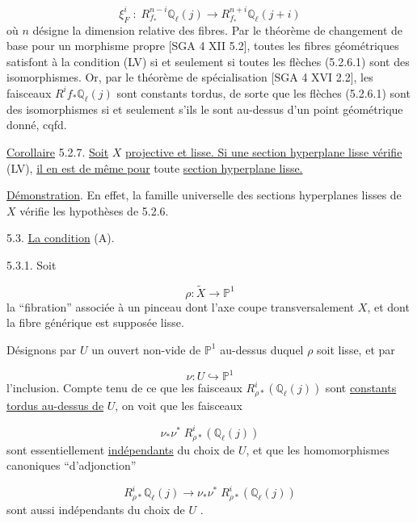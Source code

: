 \begin{equation}\tag{5.2.6.1}
\xi_F^i \; : \; R^{n-i}_{f_*}\mathbb{Q}_\ell(j) \longrightarrow R^{n+i}_{f_*}\mathbb{Q}_\ell(j+i)
\end{equation}
où $n$ désigne la dimension relative des fibres. Par le théorème de changement de base pour un morphisme propre [SGA 4 XII 5.2], toutes les fibres géométriques satisfont à la condition (LV) si et seulement si toutes les flèches (5.2.6.1) sont des isomorphismes. Or, par le théorème de spécialisation [SGA 4 XVI 2.2], les faisceaux $R^i f_*\mathbb{Q}_\ell(j)$ sont constants tordus, de sorte que les flèches (5.2.6.1) sont des isomorphismes si et seulement s'ils le sont au-dessus d'un point géométrique donné, cqfd.

\underline{Corollaire} 5.2.7. \underline{Soit} $X$ \underline{projective et lisse. Si une section hyperplane lisse vérifie} (LV), \underline{il en est de même pour} toute \underline{section hyperplane lisse.}

\underline{Démonstration}. En effet, la famille universelle des sections hyperplanes lisses de $X$ vérifie les hypothèses de 5.2.6.



5.3. \underline{La condition} (A).

5.3.1. Soit

\begin{equation*}
\rho : \widetilde{X} \longrightarrow \mathbb{P}^1
\end{equation*}
la ``fibration'' associée à un pinceau dont l'axe coupe transversalement $X$, et dont la fibre générique est supposée lisse.

Désignons par $U$ un ouvert non-vide de $\mathbb{P}^1$ au-dessus duquel $\rho$ soit lisse, et par

\begin{equation}\tag{5.3.1.1}
\nu : U \hookrightarrow \mathbb{P}^1
\end{equation}
l'inclusion. Compte tenu de ce que les faisceaux $R^i_{\rho*}(\mathbb{Q}_\ell(j))$ sont \underline{constants tordus au-dessus de} $U$, on voit que les faisceaux

\begin{equation*}
\nu_*\nu^* \; R^i_{\rho*}(\mathbb{Q}_\ell(j))
\end{equation*}
sont essentiellement \underline{indépendants} du choix de $U$, et que les homomorphismes canoniques ``d'adjonction''

\begin{equation}\tag{5.3.2}
R^i_{\rho*}\mathbb{Q}_\ell(j) \longrightarrow \nu_*\nu^* \; R^i_{\rho*}(\mathbb{Q}_\ell(j))
\end{equation}
sont aussi indépendants du choix de $U$ .

